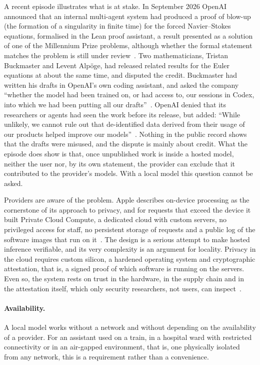 A recent episode illustrates what is at stake. In September 2026 OpenAI announced that an internal multi-agent system had
produced a proof of blow-up (the formation of a singularity in finite time) for the forced Navier--Stokes equations, formalised in the Lean proof assistant, a result presented as a solution of one of the Millennium Prize problems, although whether the formal statement matches the problem is still under review~\cite{rits2026navierstokes}. Two mathematicians, Tristan Buckmaster and Levent Alpöge, had
released related results for the Euler equations at about the same time, and disputed the credit. Buckmaster had written his
drafts in OpenAI's own coding assistant, and asked the company ``whether the model had been trained on, or had access
to, our sessions in Codex, into which we had been putting all our drafts''~\cite{kahn2026navierstokes}. OpenAI denied
that its researchers or agents had seen the work before its release, but added: ``While unlikely, we cannot rule out
that de-identified data derived from their usage of our products helped improve our
models''~\cite{rits2026navierstokes,capella2026navierstokes}. Nothing in the public record shows that the drafts were
misused, and the dispute is mainly about credit. What the episode does show is that, once unpublished work is inside a
hosted model, neither the user nor, by its own statement, the provider can exclude that it contributed to the provider's
models. With a local model this question cannot be asked.

Providers are aware of the problem. Apple describes on-device processing as the cornerstone of its approach to privacy,
and for requests that exceed the device it built Private Cloud Compute, a dedicated cloud with custom servers, no
privileged access for staff, no persistent storage of requests and a public log of the software images that run on
it~\cite{apple2024pcc}. The design is a serious attempt to make hosted inference verifiable, and its very complexity is
an argument for locality. Privacy in the cloud requires custom silicon, a hardened operating system and cryptographic
attestation, that is, a signed proof of which software is running on the servers. Even so, the system rests on trust in
the hardware, in the supply chain and in the attestation itself, which only security researchers, not users, can
inspect~\cite{apple2024pcc}.

\paragraph{Availability.} A local model works without a network and without depending on the availability of a
provider. For an assistant used on a train, in a hospital ward with restricted connectivity or in an air-gapped
environment, that is, one physically isolated from any network, this is a requirement rather than a convenience.


